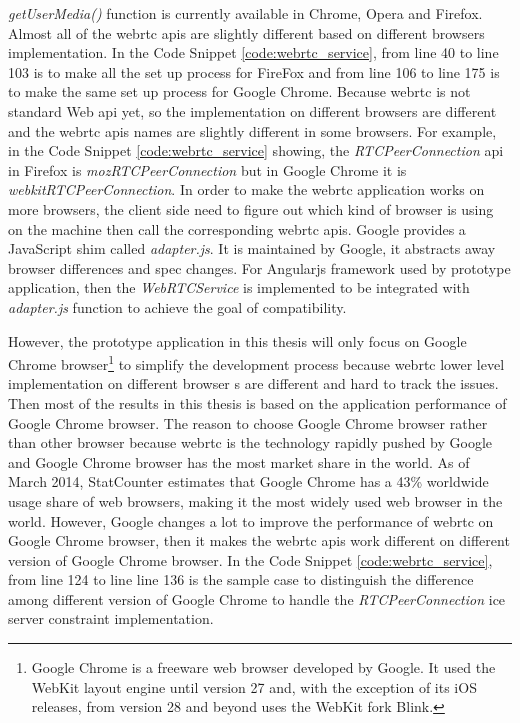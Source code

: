 \par \textit{getUserMedia()} function is currently available in Chrome, Opera and Firefox. Almost all of the \gls{webrtc} \gls{api}s are slightly different based on different browsers implementation. In the Code Snippet \ref{code:webrtc_service}, from line 40 to line 103 is to make all the set up process for FireFox and from line 106 to line 175 is to make the same set up process for Google Chrome. Because \gls{webrtc} is not standard Web \gls{api} yet, so the implementation on different browsers are different and the \gls{webrtc} \gls{api}s names are slightly different in some browsers. For example, in the Code Snippet \ref{code:webrtc_service} showing, the \textit{RTCPeerConnection} \gls{api} in Firefox is \textit{mozRTCPeerConnection} but in Google Chrome it is \textit{webkitRTCPeerConnection}. In order to make the \gls{webrtc} application works on more browsers, the client side need to figure out which kind of browser is using on the machine then call the corresponding \gls{webrtc} \gls{api}s. Google provides a JavaScript shim called \textit{adapter.js}. It is maintained by Google, it abstracts away browser differences and spec changes. For Angularjs framework used by prototype application, then the \textit{WebRTCService} is implemented to be integrated with \textit{adapter.js} function to achieve the goal of compatibility.

\par However, the prototype application in this thesis will only focus on Google Chrome browser\footnote{Google Chrome is a freeware web browser developed by Google. It used the WebKit layout engine until version 27 and, with the exception of its iOS releases, from version 28 and beyond uses the WebKit fork Blink.\cite{wiki:google_chrome}} to simplify the development process because \gls{webrtc} lower level implementation on different browser s are different and hard to track the issues. Then most of the results in this thesis is based on the application performance of Google Chrome browser. The reason to choose Google Chrome browser rather than other browser because \gls{webrtc} is the technology rapidly pushed by Google and Google Chrome browser has the most market share in the world. As of March 2014, StatCounter estimates that Google Chrome has a 43\% worldwide usage share of web browsers, making it the most widely used web browser in the world.\cite{wiki:google_chrome} However, Google changes a lot to improve the performance of \gls{webrtc} on Google Chrome browser, then it makes the \gls{webrtc} \gls{api}s work different on different version of Google Chrome browser. In the Code Snippet \ref{code:webrtc_service}, from line 124 to line line 136 is the sample case to distinguish the difference among different version of Google Chrome to handle the \textit{RTCPeerConnection} \gls{ice} server constraint implementation.

